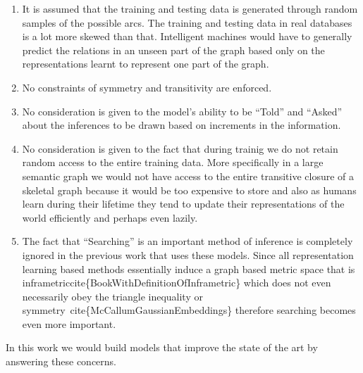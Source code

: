 \documentclass[12pt,answers]{exam} %
\renewcommand{\cite}[1]{cite\{#1\}}
\begin{document}
\begin{questions}
{    \begin{enumerate}
    \item It is assumed that the training and testing data is
      generated through random samples of the possible arcs. The
      training and testing data in real databases is a lot more skewed
      than that. Intelligent machines would have to generally predict
      the relations in an unseen part of the graph based only on the
      representations learnt to represent one part of the graph.
    \item No constraints of symmetry and transitivity are enforced.
    \item No consideration is given to the model's ability to be
      ``Told'' and ``Asked'' about the inferences to be drawn based on
      increments in the information.
    \item No consideration is given to the fact that during trainig we
      do not retain random access to the entire training data. More
      specifically in a large semantic graph we would not have access
      to the entire transitive closure of a skeletal graph because it
      would be too expensive to store and also as humans learn during
      their lifetime they tend to update their representations of the
      world efficiently and perhaps even lazily.
    \item The fact that ``Searching'' is an important method of
      inference is completely ignored in the previous work that uses
      these models. Since all representation learning based methods
      essentially induce a graph based metric space that is
      inframetric\cite{BookWithDefinitionOfInframetric} which does not
      even necessarily obey the triangle inequality or
      symmetry~\cite{McCallumGaussianEmbeddings} therefore searching
      becomes even more important.
    \end{enumerate}

    In this work we would build models that improve the state of the
    art by answering these concerns.  }



\end{questions}
\end{document}
